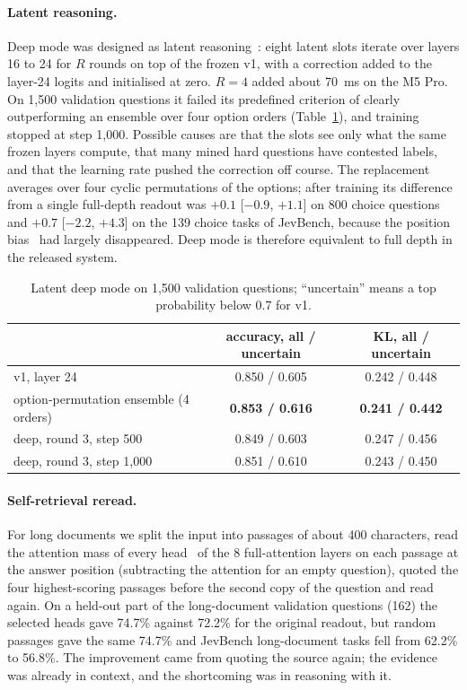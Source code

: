 \documentclass[10pt]{article}
\begin{document}
\paragraph{Latent reasoning.}
Deep mode was designed as latent reasoning~\cite{coconut,recdepth,pause}: eight latent slots iterate over layers 16 to 24 for $R$ rounds on top of the frozen v1, with a correction added to the layer-24 logits and initialised at zero.
$R=4$ added about 70~ms on the M5 Pro.
On 1,500 validation questions it failed its predefined criterion of clearly outperforming an ensemble over four option orders (Table~\ref{tab:latent}), and training stopped at step 1,000.
Possible causes are that the slots see only what the same frozen layers compute, that many mined hard questions have contested labels, and that the learning rate pushed the correction off course.
The replacement averages over four cyclic permutations of the options; after training its difference from a single full-depth readout was $+0.1$ [$-0.9$, $+1.1$] on 800 choice questions and $+0.7$ [$-2.2$, $+4.3$] on the 139 choice tasks of JevBench, because the position bias~\cite{pride,pine} had largely disappeared.
Deep mode is therefore equivalent to full depth in the released system.

\begin{table}[t]
\centering\small
\caption{Latent deep mode on 1,500 validation questions; ``uncertain'' means a top probability below 0.7 for v1.}
\label{tab:latent}
\begin{tabular}{lcc}
\toprule
 & accuracy, all / uncertain & KL, all / uncertain \\
\midrule
v1, layer 24 & 0.850 / 0.605 & 0.242 / 0.448 \\
option-permutation ensemble (4 orders) & \textbf{0.853 / 0.616} & \textbf{0.241 / 0.442} \\
deep, round 3, step 500 & 0.849 / 0.603 & 0.247 / 0.456 \\
deep, round 3, step 1,000 & 0.851 / 0.610 & 0.243 / 0.450 \\
\bottomrule
\end{tabular}
\end{table}

\paragraph{Self-retrieval reread.}
For long documents we split the input into passages of about 400 characters, read the attention mass of every head~\cite{qrhead} of the 8 full-attention layers on each passage at the answer position (subtracting the attention for an empty question), quoted the four highest-scoring passages before the second copy of the question and read again.
On a held-out part of the long-document validation questions (162) the selected heads gave 74.7\% against 72.2\% for the original readout, but random passages gave the same 74.7\% and JevBench long-document tasks fell from 62.2\% to 56.8\%.
The improvement came from quoting the source again; the evidence was already in context, and the shortcoming was in reasoning with it.
\end{document}
